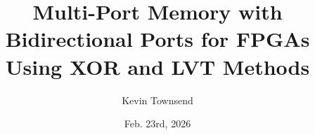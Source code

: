 \documentclass[final]{beamer} %
\title[MPM]{Multi-Port Memory with Bidirectional Ports for FPGAs Using XOR and LVT Methods}
\author[Townsend]{Kevin Townsend}
\date{Feb. 23rd, 2026}
\begin{document}
  \begin{frame}{} 
  \begin{columns}
  \end{columns}
  \end{frame}
\end{document}
